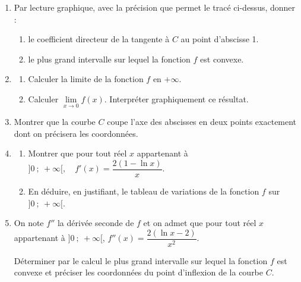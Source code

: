 \documentclass[10pt]{article}
\begin{document}
\begin{enumerate}
	\item Par lecture graphique, avec la précision que permet le tracé ci-dessus, donner :

	\begin{enumerate}
		\item le coefficient directeur de la tangente à $C$ au point d'abscisse 1.

		\item 	le plus grand intervalle sur lequel la fonction $f$ est convexe.
	\end{enumerate}

	\item \begin{enumerate}
		\item Calculer la limite de la fonction $f$ en $+\infty$.

		\item Calculer $\lim\limits_{x \to 0} f(x)$. Interpréter graphiquement ce résultat.
	\end{enumerate}

	\item Montrer que la courbe $C$ coupe l'axe des abscisses en deux points exactement dont on précisera les coordonnées.

	\item \begin{enumerate}
		\item Montrer que pour tout réel $x$ appartenant à $]0~;~+\infty[, \quad f'(x) = \dfrac{2(1-\ln x)}{x}$.

		\item En déduire, en justifiant, le tableau de variations de la fonction $f$ sur $]0~;~+\infty[$.
	\end{enumerate}

	\item On note $f''$ la dérivée seconde de $f$ et on admet que pour tout réel $x$ appartenant à $]0~;~+\infty[$, $f''(x) = \dfrac{2(\ln x-2)}{x^{2}}$.

Déterminer par le calcul le plus grand intervalle sur lequel la fonction $f$ est convexe et préciser les coordonnées du point d'inflexion de la courbe $C$.
\end{enumerate}

\vspace{1cm}
\end{document}
